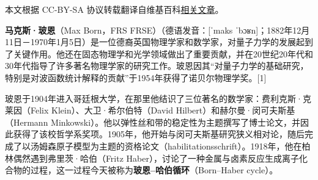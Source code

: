 
本文根据 CC-BY-SA 协议转载翻译自维基百科\href{https://en.wikipedia.org/wiki/Max_Born}{相关文章}。

\textbf{马克斯·玻恩}（Max Born，FRS FRSE）（德语发音：[ˈmaks ˈbɔʁn]；1882年12月11日－1970年1月5日）是一位德裔英国物理学家和数学家，对量子力学的发展起到了关键作用。他还在固态物理学和光学领域做出了重要贡献，并在20世纪20年代和30年代指导了许多著名物理学家的研究工作。玻恩因其“对量子力学的基础研究，特别是对波函数统计解释的贡献”于1954年获得了诺贝尔物理学奖。[1]

玻恩于1904年进入哥廷根大学，在那里他结识了三位著名的数学家：费利克斯·克莱因（Felix Klein）、大卫·希尔伯特（David Hilbert）和赫尔曼·闵可夫斯基（Hermann Minkowski）。他以弹性丝和带的稳定性为主题撰写了博士论文，并因此获得了该校哲学系奖项。1905年，他开始与闵可夫斯基研究狭义相对论，随后完成了以汤姆森原子模型为主题的资格论文（habilitationsschrift）。1918年，他在柏林偶然遇到弗里茨·哈伯（Fritz Haber），讨论了一种金属与卤素反应生成离子化合物的过程，这一过程今天被称为\textbf{玻恩–哈伯循环}（Born–Haber cycle）。